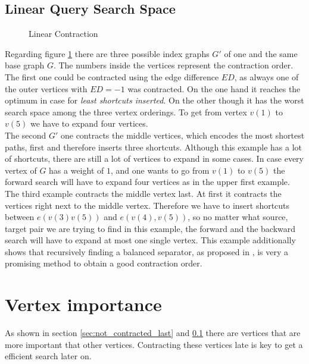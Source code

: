 \subsection{Linear Query Search Space}\label{sec:linear_query}

\begin{figure}
\centering

\caption{Linear Contraction}
\label{fig:linear_contraction}
\end{figure}

Regarding figure \ref{fig:linear_contraction} there are three possible index graphs $G'$ of one and the same base graph $G$. The numbers inside the vertices represent the contraction order.
\\
The first one could be contracted using the edge difference $ED$, as always one of the outer vertices with $ED=-1$ was contracted. On the one hand it reaches the optimum in case for \textit{least shortcuts inserted}. On the other though it has the worst search space among the three vertex orderings. 
To get from vertex $v(1)$ to $v(5)$ we have to expand four vertices. 
\\
The second $G'$ one contracts the middle vertices, which encodes the most shortest paths, first and therefore inserts three shortcuts. Although this example has a lot of shortcuts, there are still a lot of vertices to expand in some cases. In case every vertex of $G$ has a weight of $1$, and one wants to go from $v(1)$ to $v(5)$ the forward search will have to expand four vertices as in the upper first example.
\\
The third example contracts the middle vertex last. At first it contracts the vertices right next to the middle vertex. Therefore we have to insert shortcuts between $e(v(3)v(5))$ and $e(v(4), v(5))$,
so no matter what source, target pair we are trying to find in this example, the forward and the backward search will have to expand at most one single vertex. This example additionally shows that
recursively finding a balanced separator, as proposed in \cite[Customization Contraction Hierarchies]{CCH}, is very a promising method to obtain a good contraction order. 

\section{Vertex importance}\label{sec:vertex_importance}

As shown in section \ref{sec:not_contracted_last} and \ref{sec:linear_query} there are vertices that are more important that other vertices. Contracting these vertices late is key to get a efficient search later on. 

